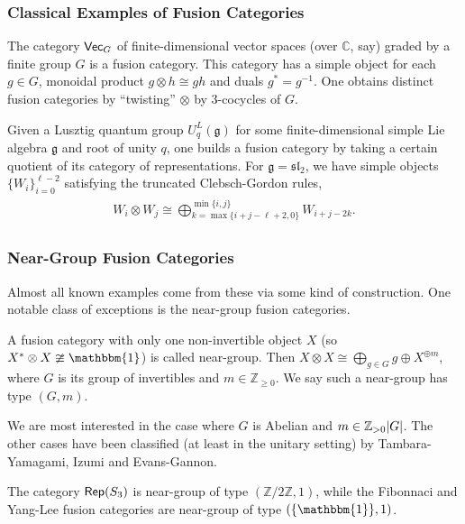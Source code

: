 \documentclass{beamer}
\theoremstyle{plain}
\theoremstyle{definition}
\DeclarePairedDelimiter{\abs}{\lvert}{\rvert}
\newcommand{\textcat}[1]{\textup{\textsf{#1}}}
\begin{document}
\begin{frame}
\frametitle{Classical Examples of Fusion Categories}
\begin{example}
The category \textcolor{structure}{$\textcat{Vec}_G$} of finite-dimensional vector spaces (over $\mathbb{C}$, say) graded by a finite group $G$ is a fusion category. This category has a simple object for each $g \in G$, monoidal product $g \otimes h \cong gh$ and duals $g^{*} = g^{-1}$. One obtains distinct fusion categories by ``twisting'' $\otimes$ by \textcolor{structure}{3-cocycles} of $G$.
\end{example}
\begin{example}
Given a Lusztig quantum group $U_q^L(\mathfrak{g})$ for some finite-dimensional simple Lie algebra $\mathfrak{g}$ and root of unity $q$, one builds a fusion category by taking a certain quotient of its category of representations. For $\mathfrak{g} = \mathfrak{sl}_2$, we have simple objects $\{W_i\}_{i=0}^{\ell-2}$ satisfying the \textcolor{structure}{truncated Clebsch-Gordon rules},
\begin{align*}
\begin{split}
W_i \otimes W_j \cong \bigoplus\nolimits_{k=\max\{i+j-\ell+2, 0\}}^{\min\{i, j\}}{W_{i+j-2k}}.
\end{split}
\end{align*}
\end{example}
\end{frame}

\begin{frame}
\frametitle{Near-Group Fusion Categories}
Almost all known examples come from these via some kind of construction. One notable class of exceptions is the \textcolor{structure}{near-group fusion categories}.
\begin{definition}
A fusion category with only one non-invertible object $X$ (so $X^{*} \otimes X \ncong \mathbbm{1}$) is called \textcolor{structure}{near-group}. Then $X \otimes X \cong \bigoplus_{g \in G}{g} \oplus X^{\oplus m}$, where $G$ is its group of invertibles and $m \in \mathbb{Z}_{\geq 0}$. We say such a near-group has \textcolor{structure}{type $(G, m)$}.
\end{definition}
We are most interested in the case where $G$ is Abelian and $m \in \mathbb{Z}_{>0}\abs{G}$. The other cases have been classified (at least in the unitary setting) by Tambara-Yamagami, Izumi and Evans-Gannon.
\begin{example}
The category $\textcat{Rep}(S_3)$ is near-group of type $(\mathbb{Z}/2\mathbb{Z}, 1)$, while the Fibonnaci and Yang-Lee fusion categories are near-group of type $(\{\mathbbm{1}\}, 1)$.
\end{example}
\end{frame}
\end{document}
